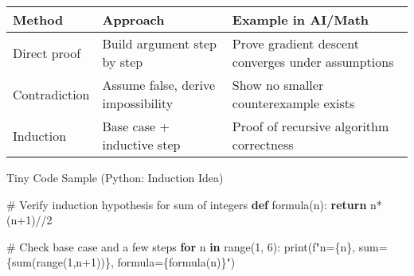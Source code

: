 \documentclass[
  letterpaper,
  DIV=11,
  numbers=noendperiod]{scrreprt}
\newenvironment{Shaded}{\begin{snugshade}}{\end{snugshade}}
\newcommand{\BuiltInTok}[1]{\textcolor[rgb]{0.00,0.23,0.31}{#1}}
\newcommand{\CommentTok}[1]{\textcolor[rgb]{0.37,0.37,0.37}{#1}}
\newcommand{\ControlFlowTok}[1]{\textcolor[rgb]{0.00,0.23,0.31}{\textbf{#1}}}
\newcommand{\DecValTok}[1]{\textcolor[rgb]{0.68,0.00,0.00}{#1}}
\newcommand{\KeywordTok}[1]{\textcolor[rgb]{0.00,0.23,0.31}{\textbf{#1}}}
\newcommand{\NormalTok}[1]{\textcolor[rgb]{0.00,0.23,0.31}{#1}}
\newcommand{\OperatorTok}[1]{\textcolor[rgb]{0.37,0.37,0.37}{#1}}
\newcommand{\SpecialCharTok}[1]{\textcolor[rgb]{0.37,0.37,0.37}{#1}}
\newcommand{\SpecialStringTok}[1]{\textcolor[rgb]{0.13,0.47,0.30}{#1}}
\begin{document}
\begin{longtable}[]{@{}
  >{\raggedright\arraybackslash}p{}
  >{\raggedright\arraybackslash}p{}
  >{\raggedright\arraybackslash}p{}@{}}
\toprule\noalign{}
\begin{minipage}[b]{\linewidth}\raggedright
Method
\end{minipage} & \begin{minipage}[b]{\linewidth}\raggedright
Approach
\end{minipage} & \begin{minipage}[b]{\linewidth}\raggedright
Example in AI/Math
\end{minipage} \\
\midrule\noalign{}
\endhead
\bottomrule\noalign{}
\endlastfoot
Direct proof & Build argument step by step & Prove gradient descent
converges under assumptions \\
Contradiction & Assume false, derive impossibility & Show no smaller
counterexample exists \\
Induction & Base case + inductive step & Proof of recursive algorithm
correctness \\
\end{longtable}

Tiny Code Sample (Python: Induction Idea)

\begin{Shaded}
\begin{Highlighting}[]
\CommentTok{\# Verify induction hypothesis for sum of integers}
\KeywordTok{def}\NormalTok{ formula(n):}
    \ControlFlowTok{return}\NormalTok{ n}\OperatorTok{*}\NormalTok{(n}\OperatorTok{+}\DecValTok{1}\NormalTok{)}\OperatorTok{//}\DecValTok{2}

\CommentTok{\# Check base case and a few steps}
\ControlFlowTok{for}\NormalTok{ n }\KeywordTok{in} \BuiltInTok{range}\NormalTok{(}\DecValTok{1}\NormalTok{, }\DecValTok{6}\NormalTok{):}
    \BuiltInTok{print}\NormalTok{(}\SpecialStringTok{f"n=}\SpecialCharTok{\{}\NormalTok{n}\SpecialCharTok{\}}\SpecialStringTok{, sum=}\SpecialCharTok{\{}\BuiltInTok{sum}\NormalTok{(}\BuiltInTok{range}\NormalTok{(}\DecValTok{1}\NormalTok{,n}\OperatorTok{+}\DecValTok{1}\NormalTok{))}\SpecialCharTok{\}}\SpecialStringTok{, formula=}\SpecialCharTok{\{}\NormalTok{formula(n)}\SpecialCharTok{\}}\SpecialStringTok{"}\NormalTok{)}
\end{Highlighting}
\end{Shaded}
\end{document}
